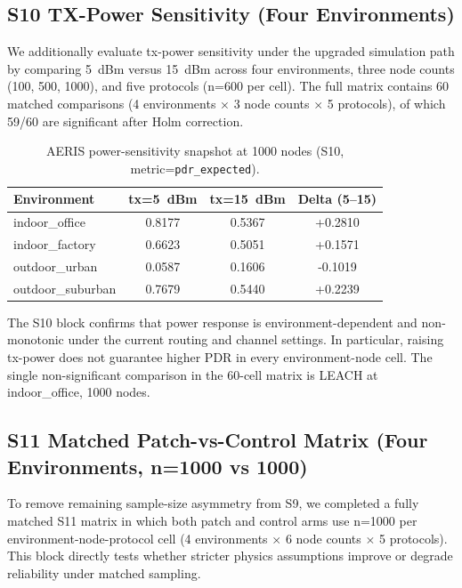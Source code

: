 \documentclass[sensors,article,submit,moreauthors,pdftex]{Definitions/mdpi}
\begin{document}
\subsection{S10 TX-Power Sensitivity (Four Environments)}
We additionally evaluate tx-power sensitivity under the upgraded simulation path by comparing \SI{5}{dBm} versus \SI{15}{dBm} across four environments, three node counts (100, 500, 1000), and five protocols (n=600 per cell). The full matrix contains 60 matched comparisons (4 environments $\times$ 3 node counts $\times$ 5 protocols), of which 59/60 are significant after Holm correction.

\begin{table}[H]
\caption{AERIS power-sensitivity snapshot at 1000 nodes (S10, metric=\texttt{pdr\_expected}).}
\label{tab:s10_aeris_1000}
\centering
\begin{tabular}{lccc}
\toprule
Environment & tx=\SI{5}{dBm} & tx=\SI{15}{dBm} & Delta (5--15) \\
\midrule
indoor\_office    & 0.8177 & 0.5367 & +0.2810 \\
indoor\_factory   & 0.6623 & 0.5051 & +0.1571 \\
outdoor\_urban    & 0.0587 & 0.1606 & -0.1019 \\
outdoor\_suburban & 0.7679 & 0.5440 & +0.2239 \\
\bottomrule
\end{tabular}
\end{table}

The S10 block confirms that power response is environment-dependent and non-monotonic under the current routing and channel settings. In particular, raising tx-power does not guarantee higher PDR in every environment-node cell. The single non-significant comparison in the 60-cell matrix is LEACH at indoor\_office, 1000 nodes.

\subsection{S11 Matched Patch-vs-Control Matrix (Four Environments, n=1000 vs 1000)}
To remove remaining sample-size asymmetry from S9, we completed a fully matched S11 matrix in which both patch and control arms use n=1000 per environment-node-protocol cell (4 environments $\times$ 6 node counts $\times$ 5 protocols). This block directly tests whether stricter physics assumptions improve or degrade reliability under matched sampling.
\end{document}
